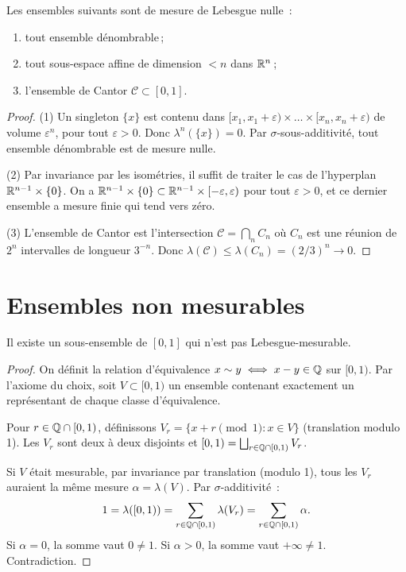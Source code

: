 \begin{proposition}
Les ensembles suivants sont de mesure de Lebesgue nulle~:
\begin{enumerate}
    \item tout ensemble d\'enombrable\,;
    \item tout sous-espace affine de dimension $< n$ dans $\mathbb{R}^n$\,;
    \item l'ensemble de Cantor $\mathcal{C} \subset [0,1]$.
\end{enumerate}
\end{proposition}

\begin{proof}
(1) Un singleton $\{x\}$ est contenu dans $[x_1, x_1 + \varepsilon) \times \ldots
\times [x_n, x_n + \varepsilon)$ de volume $\varepsilon^n$, pour tout $\varepsilon > 0$.
Donc $\lambda^n(\{x\}) = 0$. Par $\sigma$-sous-additivit\'e, tout ensemble
d\'enombrable est de mesure nulle.

(2) Par invariance par les isom\'etries, il suffit de traiter le cas de l'hyperplan
$\mathbb{R}^{n-1} \times \{0\}$. On a $\mathbb{R}^{n-1} \times \{0\} \subset \mathbb{R}^{n-1} \times
[-\varepsilon, \varepsilon)$ pour tout $\varepsilon > 0$, et ce dernier ensemble
a mesure finie qui tend vers z\'ero.

(3) L'ensemble de Cantor est l'intersection $\mathcal{C} = \bigcap_n C_n$ o\`u
$C_n$ est une r\'eunion de $2^n$ intervalles de longueur $3^{-n}$. Donc
$\lambda(\mathcal{C}) \leq \lambda(C_n) = (2/3)^n \to 0$.
\end{proof}

\section{Ensembles non mesurables}

\begin{theoreme}[Vitali, 1905]
\label{thm:vitali}
Il existe un sous-ensemble de $[0, 1]$ qui n'est pas Lebesgue-mesurable.
\end{theoreme}

\begin{proof}
On d\'efinit la relation d'\'equivalence $x \sim y \iff x - y \in \mathbb{Q}$ sur $[0,1)$.
Par l'axiome du choix, soit $V \subset [0,1)$ un ensemble contenant exactement un
repr\'esentant de chaque classe d'\'equivalence.

Pour $r \in \mathbb{Q} \cap [0,1)$, d\'efinissons $V_r = \{x + r \pmod{1} : x \in V\}$
(translation modulo 1). Les $V_r$ sont deux \`a deux disjoints et
$[0,1) = \bigsqcup_{r \in \mathbb{Q} \cap [0,1)} V_r$.

Si $V$ \'etait mesurable, par invariance par translation (modulo 1), tous les $V_r$
auraient la m\^eme mesure $\alpha = \lambda(V)$. Par $\sigma$-additivit\'e~:
\[
1 = \lambda([0,1)) = \sum_{r \in \mathbb{Q} \cap [0,1)} \lambda(V_r) =
\sum_{r \in \mathbb{Q} \cap [0,1)} \alpha.
\]
Si $\alpha = 0$, la somme vaut $0 \neq 1$. Si $\alpha > 0$, la somme vaut
$+\infty \neq 1$. Contradiction.
\end{proof}

